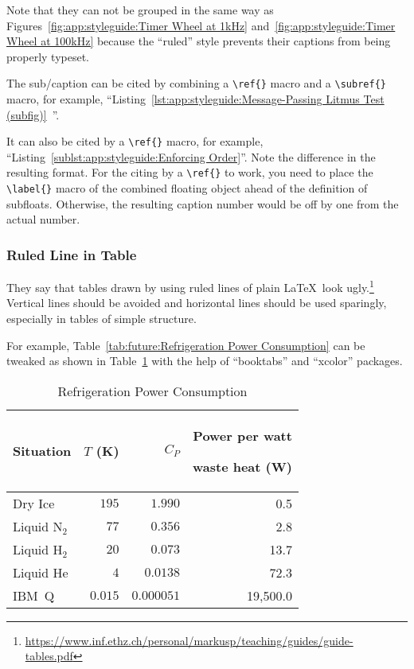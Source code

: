 Note that they can not be grouped in the same way as
Figures~\ref{fig:app:styleguide:Timer Wheel at 1kHz}
and~\ref{fig:app:styleguide:Timer Wheel at 100kHz}
because the ``ruled'' style prevents their captions
from being properly typeset.

The sub\-/caption can be cited by combining a \verb|\ref{}| macro
and a \verb|\subref{}| macro, for example,
``Listing~\ref{lst:app:styleguide:Message-Passing Litmus Test (subfig)}\,%
''.

It can also be cited by a \verb|\ref{}| macro, for example,
``Listing~\ref{sublst:app:styleguide:Enforcing Order}''.
Note the difference in the resulting format. For the citing by
a \verb|\ref{}| to work, you need to place the \verb|\label{}|
macro of the combined floating object ahead of the definition of
subfloats.
Otherwise, the resulting caption number would be off by one
from the actual number.

\subsubsection{Ruled Line in Table}
\label{sec:app:styleguide:Ruled Line in Table}

They say that tables drawn by using ruled lines of plain \LaTeX\
look ugly.\footnote{
  \url{https://www.inf.ethz.ch/personal/markusp/teaching/guides/guide-tables.pdf}
}
Vertical lines should be avoided and horizontal lines should be
used sparingly, especially in tables of simple structure.

\captionsetup[table]{position=top,hangindent=30pt}
\renewcommand*{\abovetopsep}{-7pt}

For example,
Table~\ref{tab:future:Refrigeration Power Consumption}
can be tweaked as shown in
Table~\ref{tab:app:styleguide:Refrigeration Power Consumption}
with the help of ``booktabs'' and ``xcolor'' packages.

\begin{table}[tbhp]
\renewcommand*{\arraystretch}{1.2}\centering\small
\begin{tabular}{lrrr}\toprule
Situation
	& $T$ (K)
		& $C_P$	& \parbox[b]{.75in}{\raggedleft Power per watt\par waste heat (W)} \\
\midrule
Dry Ice
	& $195$
		& $1.990$
			& 0.5 \\
Liquid N$_2$
	& $77$
		& $0.356$
			& 2.8 \\
Liquid H$_2$
	& $20$
		& $0.073$
			& 13.7 \\
Liquid He
	& $4$
		& $0.0138$
			& 72.3 \\
IBM~Q	& $0.015$
		& $0.000051$
			& 19,500.0 \\
\bottomrule
\end{tabular}
\caption{Refrigeration Power Consumption}
\label{tab:app:styleguide:Refrigeration Power Consumption}
\end{table}

